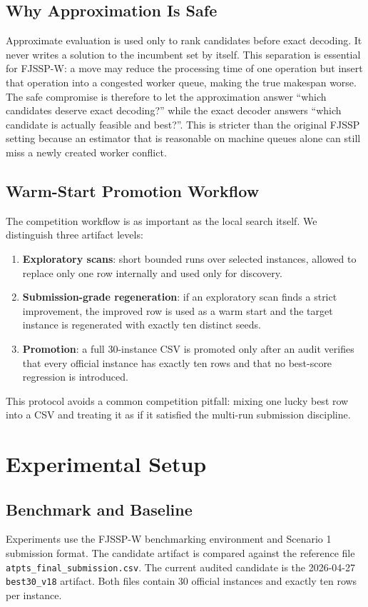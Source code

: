 \documentclass[sigconf,anonymous,review,dvipsnames]{acmart}
\begin{document}
\subsection{Why Approximation Is Safe}
Approximate evaluation is used only to rank candidates before exact decoding.
It never writes a solution to the incumbent set by itself.
This separation is essential for FJSSP-W: a move may reduce the processing time of one operation but insert that operation into a congested worker queue, making the true makespan worse.
The safe compromise is therefore to let the approximation answer ``which candidates deserve exact decoding?'' while the exact decoder answers ``which candidate is actually feasible and best?''.
This is stricter than the original FJSSP setting because an estimator that is reasonable on machine queues alone can still miss a newly created worker conflict.

\subsection{Warm-Start Promotion Workflow}
The competition workflow is as important as the local search itself.
We distinguish three artifact levels:
\begin{enumerate}
  \item \textbf{Exploratory scans}: short bounded runs over selected instances, allowed to replace only one row internally and used only for discovery.
  \item \textbf{Submission-grade regeneration}: if an exploratory scan finds a strict improvement, the improved row is used as a warm start and the target instance is regenerated with exactly ten distinct seeds.
  \item \textbf{Promotion}: a full 30-instance CSV is promoted only after an audit verifies that every official instance has exactly ten rows and that no best-score regression is introduced.
\end{enumerate}
This protocol avoids a common competition pitfall: mixing one lucky best row into a CSV and treating it as if it satisfied the multi-run submission discipline.

\section{Experimental Setup}
\subsection{Benchmark and Baseline}
Experiments use the FJSSP-W benchmarking environment and Scenario 1 submission format.
The candidate artifact is compared against the reference file \texttt{atpts\_final\_submission.csv}.
The current audited candidate is the 2026-04-27 \texttt{best30\_v18} artifact.
Both files contain 30 official instances and exactly ten rows per instance.
\end{document}
